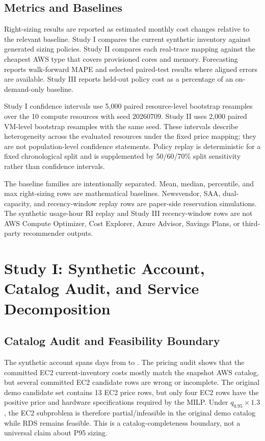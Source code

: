 \documentclass[11pt]{article}
\begin{document}
\subsection{Metrics and Baselines}

Right-sizing results are reported as estimated monthly cost changes relative
to the relevant baseline. Study I compares the current synthetic inventory
against generated sizing policies. Study II compares each real-trace mapping
against the cheapest AWS type that covers provisioned cores and memory.
Forecasting reports walk-forward MAPE and selected paired-test results where
aligned errors are available. Study III reports held-out policy cost as a
percentage of an on-demand-only baseline.

Study I confidence intervals use 5,000 paired resource-level bootstrap
resamples over the 10 compute resources with seed 20260709. Study II uses
2,000 paired VM-level bootstrap resamples with the same seed. These intervals
describe heterogeneity across the evaluated resources under the fixed price
mapping; they are not population-level confidence statements. Policy replay
is deterministic for a fixed chronological split and is supplemented by
50/60/70\% split sensitivity rather than confidence intervals.

The baseline families are intentionally separated. Mean, median, percentile,
and max right-sizing rows are mathematical baselines. Newsvendor, SAA,
dual-capacity, and recency-window replay rows are paper-side reservation
simulations. The synthetic usage-hour RI replay and Study III recency-window
rows are not AWS Compute Optimizer, Cost Explorer, Azure Advisor, Savings
Plans, or third-party recommender outputs.

\section{Study I: Synthetic Account, Catalog Audit, and Service Decomposition}
\label{sec:study1}

\subsection{Catalog Audit and Feasibility Boundary}

The synthetic account spans \nDays{} days from \dataStart{} to \dataEnd{}.
The pricing audit shows that the committed EC2 current-inventory costs mostly
match the snapshot AWS catalog, but several committed EC2 candidate rows are
wrong or incomplete. The original demo candidate set contains 13 EC2 price
rows, but only four EC2 rows have the positive price and hardware
specifications required by the MILP. Under $q_{0.95}\times1.3$, the EC2
subproblem is therefore partial/infeasible in the original demo catalog while
RDS remains feasible. This is a catalog-completeness boundary, not a
universal claim about P95 sizing.
\end{document}
